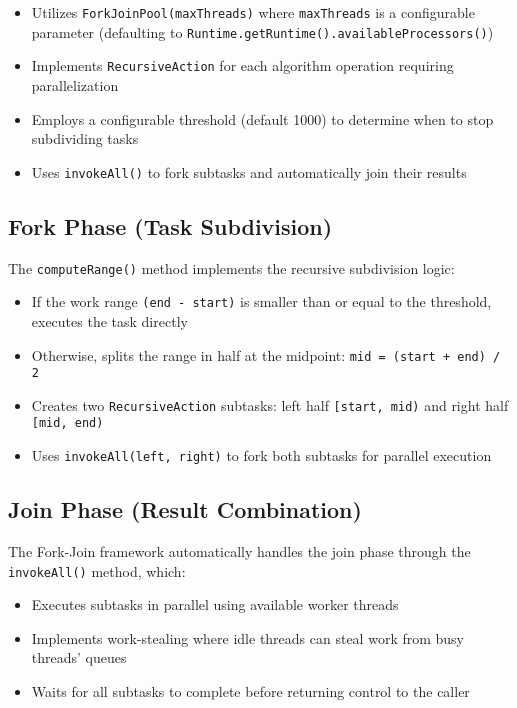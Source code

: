 \begin{itemize}
    \item Utilizes \texttt{ForkJoinPool(maxThreads)} where \texttt{maxThreads} is a configurable parameter (defaulting to \texttt{Runtime.getRuntime().availableProcessors()})
    \item Implements \texttt{RecursiveAction} for each algorithm operation requiring parallelization
    \item Employs a configurable threshold (default 1000) to determine when to stop subdividing tasks
    \item Uses \texttt{invokeAll()} to fork subtasks and automatically join their results
\end{itemize}

\subsection{Fork Phase (Task Subdivision)}
The \texttt{computeRange()} method implements the recursive subdivision logic:

\begin{itemize}
    \item If the work range \texttt{(end - start)} is smaller than or equal to the threshold, executes the task directly
    \item Otherwise, splits the range in half at the midpoint: \texttt{mid = (start + end) / 2}
    \item Creates two \texttt{RecursiveAction} subtasks: left half \texttt{[start, mid)} and right half \texttt{[mid, end)}
    \item Uses \texttt{invokeAll(left, right)} to fork both subtasks for parallel execution
\end{itemize}

\newpage

\subsection{Join Phase (Result Combination)}
The Fork-Join framework automatically handles the join phase through the \texttt{invokeAll()} method, which:

\begin{itemize}
    \item Executes subtasks in parallel using available worker threads
    \item Implements work-stealing where idle threads can steal work from busy threads' queues
    \item Waits for all subtasks to complete before returning control to the caller
\end{itemize}

